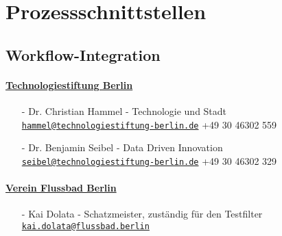 \section{Prozessschnittstellen}

\subsection{Workflow-Integration}

\paragraph{\uline{Technologiestiftung Berlin}}
\begin{itemize}
\item[-] Dr. Christian Hammel - Technologie und Stadt\newline
\href{hammel@technologiestiftung-berlin.de}{\nolinkurl{hammel@technologiestiftung-berlin.de}} \newline
		+49 30 46302 559
\item[-] Dr. Benjamin Seibel  - Data Driven Innovation\newline
		\href{seibel@technologiestiftung-berlin.de}{\nolinkurl{seibel@technologiestiftung-berlin.de}} \newline
		+49 30 46302 329
\end{itemize}

\paragraph{\uline{Verein Flussbad Berlin}}
\begin{itemize}
\item[-] Kai Dolata - Schatzmeister, zuständig für den Testfilter\newline
\href{kai.dolata@flussbad.berlin}{\nolinkurl{kai.dolata@flussbad.berlin}}
\end{itemize}
